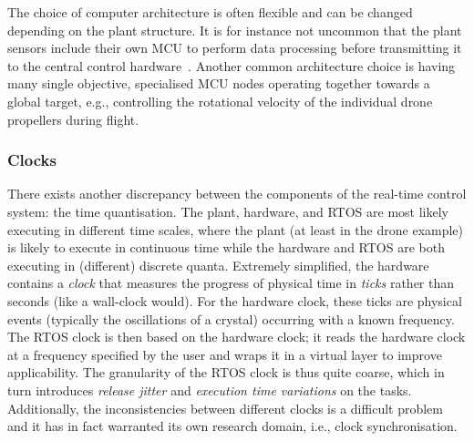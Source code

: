 The choice of computer architecture is often flexible and can be changed depending on the plant structure.
It is for instance not uncommon that the plant sensors include their own MCU to perform data processing before transmitting it to the central control hardware~\cite{Karray:2018}.
Another common architecture choice is having many single objective, specialised MCU nodes operating together towards a global target, e.g., controlling the rotational velocity of the individual drone propellers during flight.

\subsubsection{Clocks}%
%
There exists another discrepancy between the components of the real-time control system: the time quantisation.
The plant, hardware, and RTOS are most likely executing in different time scales, where the plant (at least in the drone example) is likely to execute in continuous time while the hardware and RTOS are both executing in (different) discrete quanta.
Extremely simplified, the hardware contains a \emph{clock} that measures the progress of physical time in \emph{ticks} rather than seconds (like a wall-clock would).
For the hardware clock, these ticks are physical events (typically the oscillations of a crystal) occurring with a known frequency.
The RTOS clock is then based on the hardware clock; it reads the hardware clock at a frequency specified by the user and wraps it in a virtual layer to improve applicability. 
The granularity of the RTOS clock is thus quite coarse, which in turn introduces \emph{release jitter} and \emph{execution time variations} on the tasks.
Additionally, the inconsistencies between different clocks is a difficult problem and it has in fact warranted its own research domain, i.e., clock synchronisation.

